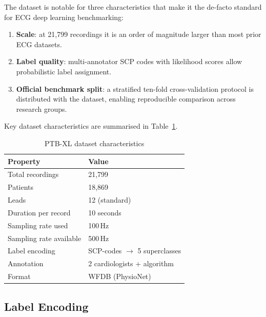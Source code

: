 The dataset is notable for three characteristics that make it the
de-facto standard for ECG deep learning benchmarking:
\begin{enumerate}
  \item \textbf{Scale}: at 21{,}799 recordings it is an order of
        magnitude larger than most prior ECG datasets.
  \item \textbf{Label quality}: multi-annotator SCP codes with
        likelihood scores allow probabilistic label assignment.
  \item \textbf{Official benchmark split}: a stratified ten-fold
        cross-validation protocol is distributed with the dataset,
        enabling reproducible comparison across research groups.
\end{enumerate}

Key dataset characteristics are summarised in Table~\ref{tab:ptbxl}.

\begin{table}[htbp]
  \centering
  \caption{PTB-XL dataset characteristics}
  \label{tab:ptbxl}
  \begin{tabular}{ll}
    \hline
    \textbf{Property}           & \textbf{Value}                    \\
    \hline
    Total recordings            & 21{,}799                          \\
    Patients                    & 18{,}869                          \\
    Leads                       & 12 (standard)                     \\
    Duration per record         & 10 seconds                        \\
    Sampling rate used          & 100\,Hz                           \\
    Sampling rate available     & 500\,Hz                           \\
    Label encoding              & SCP-codes $\to$ 5 superclasses    \\
    Annotation                  & 2 cardiologists + algorithm       \\
    Format                      & WFDB (PhysioNet)                  \\
    \hline
  \end{tabular}
\end{table}

\subsection{Label Encoding}

